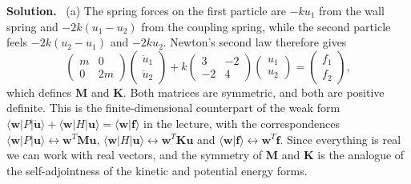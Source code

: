 \documentclass[a4paper,12pt]{paper}
\newenvironment{solution}{\par\noindent\textbf{Solution.}\ }{\par\medskip}
\begin{document}
\begin{solution}
(a) The spring forces on the first particle are $-ku_{1}$ from the wall spring and
$-2k(u_{1}-u_{2})$ from the coupling spring, while the second particle feels $-2k(u_{2}-u_{1})$
and $-2ku_{2}$. Newton's second law therefore gives
\begin{equation}
\begin{pmatrix} m & 0 \\ 0 & 2m\end{pmatrix}
\begin{pmatrix}\ddot{u}_{1}\\ \ddot{u}_{2}\end{pmatrix}
+k\begin{pmatrix} 3 & -2 \\ -2 & 4\end{pmatrix}
\begin{pmatrix}u_{1}\\ u_{2}\end{pmatrix}
=\begin{pmatrix}f_{1}\\ f_{2}\end{pmatrix},
\label{eq:1}
\end{equation}
which defines $\mathbf{M}$ and $\mathbf{K}$. Both matrices are symmetric, and both are positive
definite. This is the finite-dimensional counterpart of the weak form
$\langle\mathbf{w}|P|\ddot{\mathbf{u}}\rangle+\langle\mathbf{w}|H|\mathbf{u}\rangle=\langle\mathbf{w}|\mathbf{f}\rangle$
in the lecture, with the correspondences
$\langle\mathbf{w}|P|\mathbf{u}\rangle\leftrightarrow\mathbf{w}^{T}\mathbf{M}\mathbf{u}$,
$\langle\mathbf{w}|H|\mathbf{u}\rangle\leftrightarrow\mathbf{w}^{T}\mathbf{K}\mathbf{u}$ and
$\langle\mathbf{w}|\mathbf{f}\rangle\leftrightarrow\mathbf{w}^{T}\mathbf{f}$. Since everything
is real we can work with real vectors, and the symmetry of $\mathbf{M}$ and $\mathbf{K}$ is
the analogue of the self-adjointness of the kinetic and potential energy forms.


\end{solution}
\end{document}
